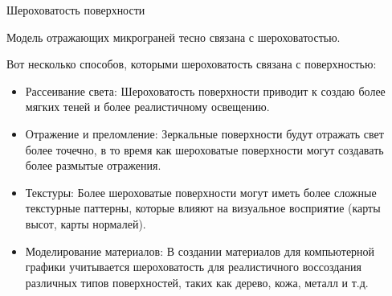 \documentclass{beamer}
\begin{document}
	\begin{frame}{Шероховатость поверхности}

		Модель отражающих микрограней тесно связана с шероховатостью.


		
		Вот несколько способов, которыми шероховатость связана с поверхностью:

		\begin{itemize}
			\item 
			Рассеивание света: Шероховатость поверхности приводит к создаю более мягких теней и более реалистичному освещению.
			\item 
			Отражение и преломление: Зеркальные поверхности будут отражать свет более точечно, в то время как шероховатые поверхности могут создавать более размытые отражения.
			\item 
			Текстуры: Более шероховатые поверхности могут иметь более сложные текстурные паттерны, которые влияют на визуальное восприятие (карты высот, карты нормалей).
			\item 
			Моделирование материалов: В создании материалов для компьютерной графики учитывается шероховатость для реалистичного воссоздания различных типов поверхностей, таких как дерево, кожа, металл и т.д.
		\end{itemize}

	\end{frame}
\end{document}
